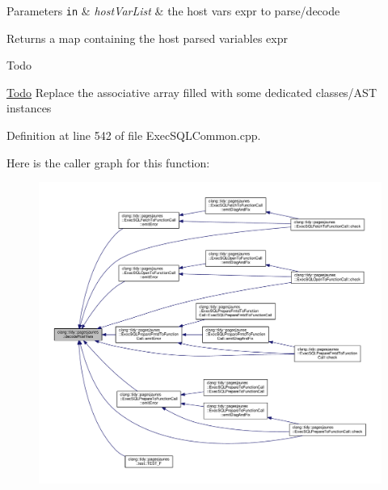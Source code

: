 \begin{DoxyParams}[1]{Parameters}
\mbox{\tt in}  & {\em host\+Var\+List} & the host vars expr to parse/decode\\
\hline
\end{DoxyParams}
\begin{DoxyReturn}{Returns}
a map containing the host parsed variables expr
\end{DoxyReturn}
\begin{DoxyRefDesc}{Todo}
\item[\hyperlink{todo__todo000003}{Todo}]Replace the associative array filled with some dedicated classes/\+A\+ST instances \end{DoxyRefDesc}


Definition at line 542 of file Exec\+S\+Q\+L\+Common.\+cpp.

Here is the caller graph for this function\+:
\nopagebreak
\begin{figure}[H]
\begin{center}
\leavevmode
\includegraphics[width=350pt]{namespaceclang_1_1tidy_1_1pagesjaunes_a3ebb843a3b48b63600a608b7953b7a90_icgraph}
\end{center}
\end{figure}
\mbox{\label{namespaceclang_1_1tidy_1_1pagesjaunes_a6adf1713b6f527e8823a8098aa1022ef}} 

